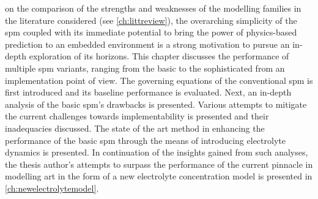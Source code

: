 




 on the  comparison of the strengths and  weaknesses of the
modelling families in the  literature considered (see \cref{ch:littreview}), the
overarching simplicity of the \gls{spm}  coupled with its immediate potential to
bring the  power of  physics-based prediction  to an  embedded environment  is a
strong  motivation to  pursue  an  in-depth exploration  of  its horizons.  This
chapter discusses the  performance of multiple \gls{spm}  variants, ranging from
the  basic to  the  sophisticated  from an  implementation  point  of view.  The
governing  equations  of the  conventional  \gls{spm}  is first  introduced  and
its  baseline  performance is  evaluated.  Next,  an  in-depth analysis  of  the
basic  \gls{spm}'s drawbacks  is  presented. Various  attempts  to mitigate  the
current challenges towards implementability  is presented and their inadequacies
discussed. The state of the art method in enhancing the performance of the basic
\gls{spm} through the means of introducing electrolyte dynamics is presented. In
continuation  of the  insights gained  from such  analyses, the  thesis author's
attempts  to  surpass the  performance  of  the  current pinnacle  in  modelling
art  in  the  form  of  a  new  electrolyte  concentration  model  is  presented
in \cref{ch:newelectrolytemodel}.










